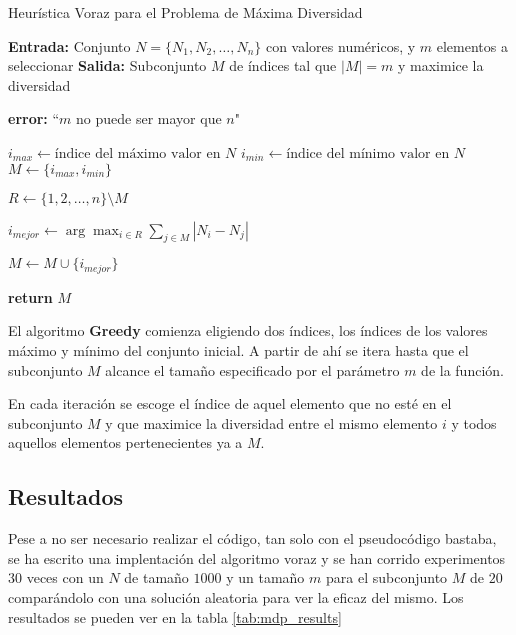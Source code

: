 \documentclass[12pt,letterpaper]{article}
\begin{document}
\begin{algorithm}
    \caption{Heurística Voraz para el Problema de Máxima Diversidad}
    \begin{algorithmic}[1]
    \State \textbf{Entrada:} Conjunto $N = \{N_1, N_2, \ldots, N_n\}$ con valores numéricos, y $m$ elementos a seleccionar
    \State \textbf{Salida:} Subconjunto $M$ de índices tal que $|M| = m$ y maximice la diversidad
    
        \State \textbf{error:} ``$m$ no puede ser mayor que $n$"
    \EndIf
    
    \State $i_{max} \gets \text{índice del máximo valor en } N$
    \State $i_{min} \gets \text{índice del mínimo valor en } N$
    \State $M \gets \{i_{max}, i_{min}\}$
    
        \State $R \gets \{1, 2, \ldots, n\} \setminus M$ 
        
        \State $i_{mejor} \gets \arg\max_{i \in R} \sum_{j \in M} |N_i - N_j|$
        
        \State $M \gets M \cup \{i_{mejor}\}$
    \EndWhile
    
    \State \textbf{return} $M$
    \EndProcedure
    \end{algorithmic}
\end{algorithm}

El algoritmo \textbf{Greedy} comienza eligiendo dos índices, los índices de los valores máximo y mínimo del conjunto inicial. A partir de ahí se itera hasta que el subconjunto $M$ alcance el tamaño especificado por el parámetro $m$ de la función. 

En cada iteración se escoge el índice de aquel elemento que no esté en el subconjunto $M$ y que maximice la diversidad entre el mismo elemento $i$ y todos aquellos elementos pertenecientes ya a $M$.

\subsection{Resultados}
Pese a no ser necesario realizar el código, tan solo con el pseudocódigo bastaba, se ha escrito una implentación del algoritmo voraz y se han corrido experimentos $30$  veces con un $N$ de tamaño $1000$ y un tamaño $m$ para el subconjunto $M$ de $20$ comparándolo con una solución aleatoria para ver la eficaz del mismo. Los resultados se pueden ver en la tabla \ref{tab:mdp_results}
\end{document}
